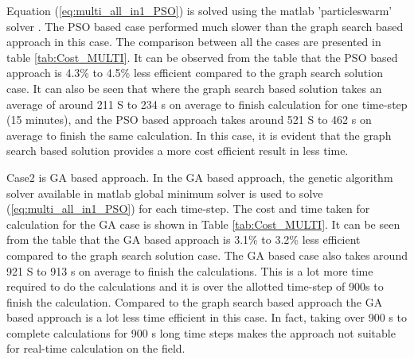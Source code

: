 Equation (\ref{eq:multi_all_in1_PSO}) is solved using the matlab 'particleswarm' solver \cite{MW_PSO}. The PSO based case performed much slower than the graph search based approach in this case. The comparison between all the cases are presented in table \ref{tab:Cost_MULTI}. It can be observed from the table that the PSO based approach is 4.3\% to 4.5\% less efficient compared to the graph search solution case. It can also be seen that where the graph search based solution takes an average of around 211 S to 234 s on average to finish calculation for one time-step (15  minutes), and the PSO based approach takes around 521 S to 462 s on average to finish the same calculation. In this case, it is evident that the graph search based solution provides a more cost efficient result in less time.

Case2 is GA based approach. In the GA based approach, the genetic algorithm solver available in matlab global minimum solver \cite{MW_GA} is used to solve (\ref{eq:multi_all_in1_PSO}) for each time-step. The cost and time taken for calculation for the GA case is shown in Table \ref{tab:Cost_MULTI}. It can be seen from the table that the GA based approach is 3.1\% to 3.2\% less efficient compared to the graph search solution case. The GA based case also takes around 921 S to 913 s on average to finish the calculations. This is a lot more time required to do the calculations and it is over the allotted time-step of 900s to finish the calculation. Compared to the graph search based approach the GA based approach is a lot less time efficient in this case. In fact, taking over 900 s to complete calculations for 900 s long time steps makes the approach not suitable for real-time calculation on the field.

